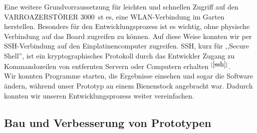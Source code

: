 \documentclass[11pt,a4paper]{article}
\newcommand{\bibRef}[1]{\hyperlink{#1}{$^{[\ref*{#1}{}]}$}}
\newcommand{\productName}{VARROAZERSTÖRER 3000}
\begin{document}
Eine weitere Grundvorraussetzung für leichten und schnellen Zugriff auf den \productName \ st es, eine WLAN-Verbindung im Garten herstellen. Besonders für den Entwicklungsprozess ist es wichtig, ohne physische Verbindung auf das Board zugreifen zu können. Auf diese Weise konnten wir per SSH-Verbindung auf den Einplatinencomputer zugreifen. SSH, kurz für ,,Secure Shell'', ist ein kryptographisches Protokoll durch das Entwickler Zugang zu Kommandozeilen von entfernten Servern oder Computern erhalten \bibRef{ssh}.\\
Wir konnten Programme starten, die Ergebnisse einsehen und sogar die Software ändern, während unser Prototyp an einem Bienenstock angebracht war. Dadurch konnten wir unseren Entwicklungsprozess weiter vereinfachen.

\subsection{Bau und Verbesserung von Prototypen}
\end{document}
